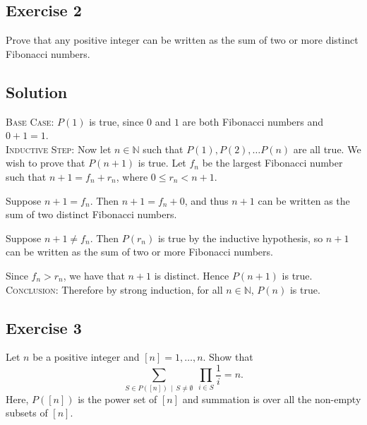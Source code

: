 \documentclass{article}
\begin{document}
\subsection*{Exercise 2}
    Prove that any positive integer can be written as the sum of two or more distinct Fibonacci numbers.

\subsection*{Solution}
    \textsc{Base Case}:  $P(1)$ is true, since $0$ and $1$ are both Fibonacci numbers and $0 + 1 = 1$. \\
    \textsc{Inductive Step}: Now let $n \in \mathbb{N}$ such that $P(1), P(2), \dots P(n)$ are all true. We wish to prove that $P(n + 1)$ is true. Let $f_{n}$ be the largest Fibonacci number such that $n + 1 = f_{n} + r_{n}$, where $0 \le r_{n} < n + 1$.
    \begin{Cases}
        \item Suppose $n + 1 = f_{n}$. Then $n + 1 = f_{n} + 0$, and thus $n + 1$ can be written as the sum of two distinct Fibonacci numbers.
        \item Suppose $n + 1 \ne f_{n}$. Then $P(r_{n})$ is true by the inductive hypothesis, so $n + 1$ can be written as the sum of two or more Fibonacci numbers.
    \end{Cases}
    Since $f_{n} > r_{n}$, we have that $n + 1$ is distinct. Hence $P(n + 1)$ is true. \\
    \textsc{Conclusion}: Therefore by strong induction, for all $n \in \mathbb{N}$, $P(n)$ is true.

\subsection*{Exercise 3}
    Let $n$ be a positive integer and $[n] = 1, \dots, n$. Show that $$\sum_{S \in P([n]) \, \mid \, S \ne \emptyset} \: \prod_{i \in S} \frac{1}{i} = n.$$ Here, $P([n])$ is the power set of $[n]$ and summation is over all the non-empty subsets of $[n]$.
\end{document}
